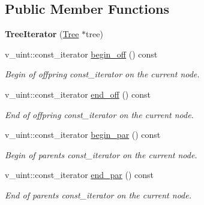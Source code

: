 \subsection*{Public Member Functions}
\begin{DoxyCompactItemize}
\item 
\mbox{\label{classTreeIterator_a743f2a767abbac4da1fcc5b4029b94f2}} 
{\bfseries Tree\+Iterator} (\hyperlink{classTree}{Tree} $\ast$tree)
\item 
\mbox{\label{classTreeIterator_a1e2637f88b0548b98a70cbef8a12ffe2}} 
v\+\_\+uint\+::const\+\_\+iterator \hyperlink{classTreeIterator_a1e2637f88b0548b98a70cbef8a12ffe2}{begin\+\_\+off} () const
\begin{DoxyCompactList}\small\item\em Begin of offpring {\ttfamily const\+\_\+iterator} on the current node. \end{DoxyCompactList}\item 
\mbox{\label{classTreeIterator_acd60bfb300b7ea25d7d270424b1d680b}} 
v\+\_\+uint\+::const\+\_\+iterator \hyperlink{classTreeIterator_acd60bfb300b7ea25d7d270424b1d680b}{end\+\_\+off} () const
\begin{DoxyCompactList}\small\item\em End of offpring {\ttfamily const\+\_\+iterator} on the current node. \end{DoxyCompactList}\item 
\mbox{\label{classTreeIterator_ac401c51b2a8b33e7db63b850350c21ce}} 
v\+\_\+uint\+::const\+\_\+iterator \hyperlink{classTreeIterator_ac401c51b2a8b33e7db63b850350c21ce}{begin\+\_\+par} () const
\begin{DoxyCompactList}\small\item\em Begin of parents {\ttfamily const\+\_\+iterator} on the current node. \end{DoxyCompactList}\item 
\mbox{\label{classTreeIterator_a89ccb546a2fc6add499ac54ecb5271f8}} 
v\+\_\+uint\+::const\+\_\+iterator \hyperlink{classTreeIterator_a89ccb546a2fc6add499ac54ecb5271f8}{end\+\_\+par} () const
\begin{DoxyCompactList}\small\item\em End of parents {\ttfamily const\+\_\+iterator} on the current node. \end{DoxyCompactList}\item 

\end{DoxyCompactItemize}
